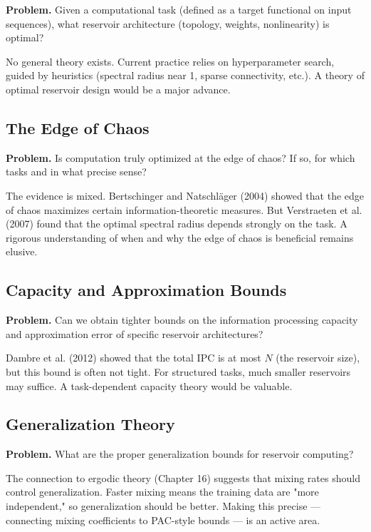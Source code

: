 \textbf{Problem.} Given a computational task (defined as a target functional on input sequences), what reservoir architecture (topology, weights, nonlinearity) is optimal?

No general theory exists. Current practice relies on hyperparameter search, guided by heuristics (spectral radius near 1, sparse connectivity, etc.). A theory of optimal reservoir design would be a major advance.

\subsection{The Edge of Chaos}\label{sec:17.8.2}

\textbf{Problem.} Is computation truly optimized at the edge of chaos? If so, for which tasks and in what precise sense?

The evidence is mixed. Bertschinger and Natschläger (2004) showed that the edge of chaos maximizes certain information-theoretic measures. But Verstraeten et al. (2007) found that the optimal spectral radius depends strongly on the task. A rigorous understanding of when and why the edge of chaos is beneficial remains elusive.

\subsection{Capacity and Approximation Bounds}\label{sec:17.8.3}

\textbf{Problem.} Can we obtain tighter bounds on the information processing capacity and approximation error of specific reservoir architectures?

Dambre et al. (2012) showed that the total IPC is at most $N$ (the reservoir size), but this bound is often not tight. For structured tasks, much smaller reservoirs may suffice. A task-dependent capacity theory would be valuable.

\subsection{Generalization Theory}\label{sec:17.8.4}

\textbf{Problem.} What are the proper generalization bounds for reservoir computing?

The connection to ergodic theory (Chapter 16) suggests that mixing rates should control generalization. Faster mixing means the training data are "more independent," so generalization should be better. Making this precise --- connecting mixing coefficients to PAC-style bounds --- is an active area.

